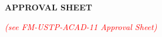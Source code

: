 
\begin{center}

    {\bfseries APPROVAL SHEET }

    \vspace{1\baselineskip}

    \textcolor{red}{\textit{(see FM-USTP-ACAD-11 Approval Sheet)}}

\end{center}

\clearpage{}